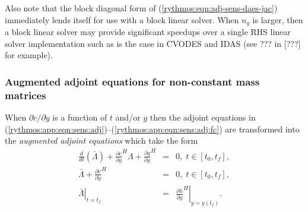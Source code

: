 \documentclass[pdf,ps2pdf,11pt]{SANDreport}
\begin{document}
Also note that the block diagonal form of
(\ref{rythmos:eqn:adj-sens-daes-jac}) immediately lends itself for use with a
block linear solver.  When $n_g$ is larger, then a block linear solver may
provide significant speedups over a single RHS linear solver implementation
such as is the case in CVODES and IDAS (see ??? in [???] for example).

\subsubsection{Augmented adjoint equations for non-constant mass matrices}

When $\partial c / {}\partial {}\dot{y}$ is a function of $t$ and/or $y$ then
the adjoint equations in
(\ref{rythmos:app:eqn:sens:adj})--(\ref{rythmos:app:eqn:sens:adj:fc}) are
transformed into the {}\textit{augmented adjoint equations} which take the
form
%
\begin{eqnarray}
\frac{d}{dt}\left( \bar{\Lambda} \right)
+  \frac{\partial c}{\partial y}^H \Lambda + \frac{\partial g}{\partial y}^H
& = & 0, \; t \in \left[ t_0, t_f \right],
\label{rythmos:app:eqn:sens:aug-adj-de} \\
\bar{\Lambda} + \frac{\partial c}{\partial \dot{y}}^H
& = & 0, \; t \in \left[ t_0, t_f \right],
\label{rythmos:app:eqn:sens:aug-adj-ae} \\
\left. \bar{\Lambda} \right|_{t=t_f}
& = & \left. \frac{\partial h}{\partial y}^H \right|_{y=y(t_f)}.
\label{rythmos:eqn:sens:aug-adj:fc}
\end{eqnarray}
\end{document}
